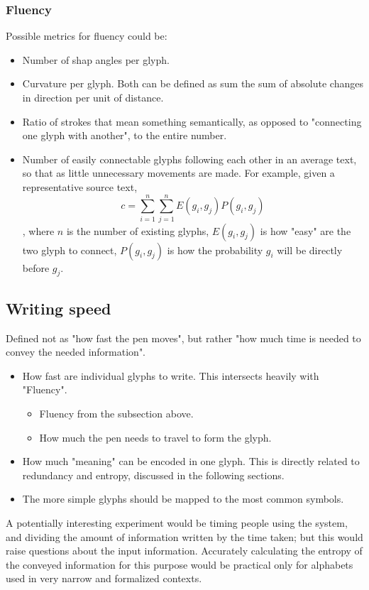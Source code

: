 \documentclass[conference]{IEEEtran}
\begin{document}
\subsubsection{Fluency}
Possible metrics for fluency could be:
\begin{itemize}
        \item Number of shap angles per glyph.
        \item Curvature per glyph. Both can be defined as sum the sum of absolute changes in direction per unit of distance.
        \item Ratio of strokes that mean something semantically, as opposed to "connecting one glyph with another", to the entire number.
        \item Number of easily connectable glyphs following each other in an average text, so that as little unnecessary movements are made. For example, given a representative source text, 
                \[c=\sum_{i=1}^n\sum_{j=1}^nE(g_i, g_j)P(g_i,g_j)\], where \(n\) is the number of existing glyphs, \(E(g_i, g_j)\) is how "easy" are the two glyph to connect, \(P(g_i, g_j)\) is how the probability \(g_i\) will be directly before \(g_j\).
\end{itemize}

\subsection{Writing speed}
Defined not as "how fast the pen moves", but rather "how much time is needed to convey the needed information".

\begin{itemize}
        \item How fast are individual glyphs to write. This intersects heavily with "Fluency".
                \begin{itemize}
                        \item Fluency from the subsection above.
                        \item How much the pen needs to travel to form the glyph.
                \end{itemize}
        \item How much "meaning" can be encoded in one glyph. This is directly related to redundancy and entropy, discussed in the following sections.
        \item The more simple glyphs should be mapped to the most common symbols.
\end{itemize}

A potentially interesting experiment would be timing people using the system, and dividing the amount of information written by the time taken; but this would raise questions about the input information. Accurately calculating the entropy of the conveyed information for this purpose would be practical only for alphabets used in very narrow and formalized contexts.
\end{document}
